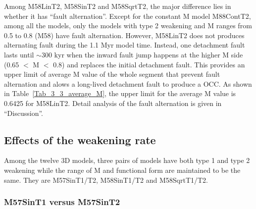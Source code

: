 Among M58LinT2, M58SinT2 and M58SqrtT2, the major difference lies in whether it has ``fault alternation''. Except for the constant M model M88ContT2, among all the models, only the models with type 2 weakening and M ranges from 0.5 to 0.8 (M58) have fault alternation. However, M58LinT2 does not produces alternating fault during the 1.1 Myr model time. Instead, one detachment fault lasts until $\sim$300 kyr when the inward fault jump happens at the higher M side (0.65 $<$ M $<$ 0.8) and replaces the initial detachment fault. This provides an upper limit of average M value of the whole segment that prevent fault alternation and alows a long-lived detachment fault to produce a OCC. As shown in Table~\hyperref[Tab_3_3_average_M]{\ref{Tab_3_3_average_M}}, the upper limit for the average M value is 0.6425 for M58LinT2. Detail analysis of the fault alternation is given in ``Discussion''.

\subsection{Effects of the weakening rate}

Among the twelve 3D models, three pairs of models have both type 1 and type 2 weakening while the range of M and functional form are maintained to be the same. They are M57SinT1/T2, M58SinT1/T2 and M58SqrtT1/T2.

\subsubsection{M57SinT1 versus M57SinT2}


